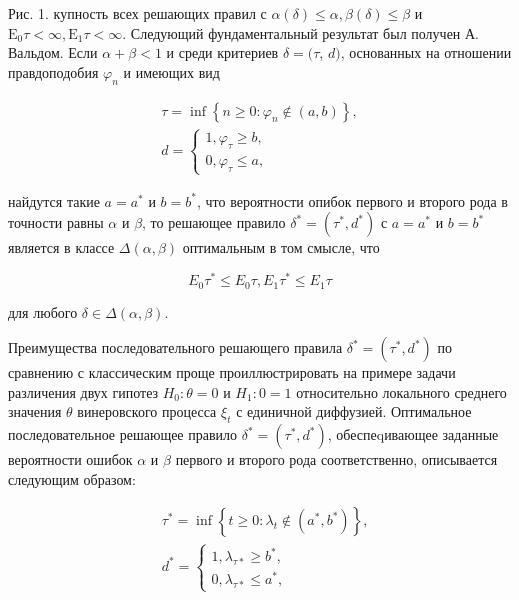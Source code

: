 \documentclass[10pt]{article}
\begin{document}
Рис. 1. купность всех решающих правил с $\alpha(\delta) \leqslant \alpha, \beta(\delta) \leqslant \beta$ и $\mathrm{E}_{0} \tau<\infty, \mathrm{E}_{1} \tau<\infty$. Следующий фундаментальный результат был получен А. Вальдом. Если $\alpha+\beta<1$ и среди критериев $\delta=(\tau$, $d)$, основанных на отношении правдоподобия $\varphi_{n}$ и имеющих вид



\[

\begin{gathered}

\tau=\inf \left\{n \geqslant 0: \varphi_{n} \notin(a, b)\right\}, \\

d=\left\{\begin{array}{l}

1, \varphi_{\tau} \geqslant b, \\

0, \varphi_{\tau} \leqslant a,

\end{array}\right.

\end{gathered}

\]



найдутся такие $a=a^{*}$ и $b=b^{*}$, что вероятности опибок первого и второго рода в точности равны $\alpha$ и $\beta$, то решающее правило $\delta^{*}=\left(\tau^{*}, d^{*}\right)$ с $a=a^{*}$ и $b=b^{*}$ является в классе $\Delta(\alpha, \beta)$ оптимальным в том смысле, что



\[

E_{0} \tau^{*} \leqslant E_{0} \tau, E_{1} \tau^{*} \leqslant E_{1} \tau

\]



для любого $\delta \in \Delta(\alpha, \beta)$.



Преимущества последовательного решающего правила $\delta^{*}=\left(\tau^{*}, d^{*}\right)$ по сравнению с классическим проще проиллюстрировать на примере задачи различения двух гипотез $H_{0}: \theta=0$ и $H_{1}: 0=1$ относительно локального среднего значения $\theta$ винеровского процесса $\xi_{t}$ с единичной диффузией. Оптимальное последовательное решающее правило $\delta^{*}=\left(\tau^{*}, d^{*}\right)$, обеспеqивающее заданные вероятности ошибок $\alpha$ и $\beta$ первого и второго рода соответственно, описывается следующим образом:



\[

\begin{aligned}

& \tau^{*}=\inf \left\{t \geqslant 0: \lambda_{t} \notin\left(a^{*}, b^{*}\right)\right\}, \\

& d^{*}=\left\{\begin{array}{l}

1, \lambda_{\tau *} \geqslant b^{*}, \\

0, \lambda_{\tau *} \leqslant a^{*},

\end{array}\right.

\end{aligned}

\]
\end{document}
